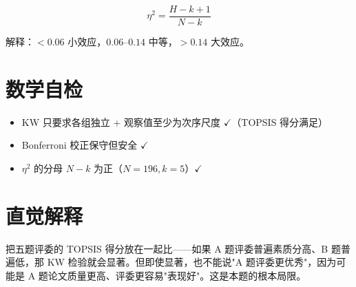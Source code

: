 \documentclass[UTF8]{ctexart}
\begin{document}
\begin{equation}
\eta^2 = \frac{H - k + 1}{N - k}
\end{equation}

解释：$<0.06$ 小效应，$0.06$–$0.14$ 中等，$>0.14$ 大效应。

\section{数学自检}

\begin{itemize}
\item KW 只要求各组独立 + 观察值至少为次序尺度 $\checkmark$（TOPSIS 得分满足）
\item Bonferroni 校正保守但安全 $\checkmark$
\item $\eta^2$ 的分母 $N-k$ 为正（$N=196, k=5$）$\checkmark$
\end{itemize}

\section{直觉解释}

把五题评委的 TOPSIS 得分放在一起比——如果 A 题评委普遍素质分高、B 题普遍低，那 KW 检验就会显著。但即使显著，也不能说"A 题评委更优秀"，因为可能是 A 题论文质量更高、评委更容易"表现好"。这是本题的根本局限。
\end{document}
